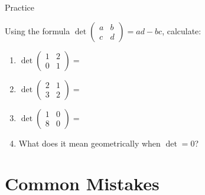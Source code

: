 \documentclass[10pt]{beamer}
\theoremstyle{definition}
\begin{document}
\begin{frame}{Practice}

Using the formula $\det \begin{pmatrix} a & b \\ c & d \end{pmatrix} = ad - bc$, calculate:

\vfill

\begin{enumerate}
\item $\det \begin{pmatrix} 1 & 2 \\ 0 & 1 \end{pmatrix} = $

\vfill

\item $\det \begin{pmatrix} 2 & 1 \\ 3 & 2 \end{pmatrix} = $

\vfill

\item $\det \begin{pmatrix} 1 & 0 \\ 8 & 0 \end{pmatrix} = $

\vfill

\item What does it mean geometrically when $\det = 0$?
\end{enumerate}

\vfill

\end{frame}


\section{Common Mistakes}
\end{document}
